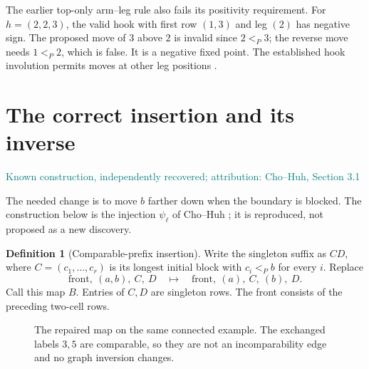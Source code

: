 \documentclass[11pt,a4paper]{article}
\theoremstyle{definition}
\newtheorem{definition}[theorem]{Definition}
\newcommand{\cell}[4]{\draw[draw=ink,fill=#4,rounded corners=1pt] (#1,#2) rectangle ++(.68,.68);\node[text=ink] at (#1+.34,#2+.34) {$#3$};}
\newcommand{\tagline}[1]{\par\smallskip\noindent\textcolor{teal}{\small\textsf{#1}}\par\smallskip}
\begin{document}
The earlier top-only arm--leg rule also fails its positivity requirement.
For $h=(2,2,3)$, the valid hook with first row $(1,3)$ and leg $(2)$ has
negative sign. The proposed move of $3$ above $2$ is invalid since
$2<_P3$; the reverse move needs $1<_P2$, which is false. It is a negative
fixed point. The established hook involution permits moves at other leg
positions \cite{sagantom}.

\section{The correct insertion and its inverse}

\tagline{Known construction, independently recovered; attribution: Cho--Huh, Section 3.1}
The needed change is to move $b$ farther down when the boundary is blocked.
The construction below is the injection $\psi_\ell$ of Cho--Huh
\cite{chohuh}; it is reproduced, not proposed as a new discovery.

\begin{definition}[Comparable-prefix insertion]
Write the singleton suffix as $C D$, where $C=(c_1,\ldots,c_r)$ is its
longest initial block with $c_i<_P b$ for every $i$. Replace
\[
 \text{front},\ (a,b),\ C,\ D
 \quad\longmapsto\quad
 \text{front},\ (a),\ C,\ (b),\ D.
\]
Call this map $B$. Entries of $C,D$ are singleton rows. The front consists
of the preceding two-cell rows.
\end{definition}

\begin{figure}[ht]
\centering
{}
\caption{The repaired map on the same connected example. The exchanged
labels $3,5$ are comparable, so they are not an incomparability edge and no
graph inversion changes.}
\end{figure}
\end{document}
